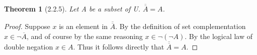 \documentclass[a4paper, 12pt]{article}
\theoremstyle{plain}
\newtheorem*{theorem*}{Theorem}
\begin{document}
	
	\begin{theorem*}[2.2.5]
		Let A be a subset of U. $\overline{\overline{A}} = A$.
	\end{theorem*}
	
	\begin{proof}
		Suppose $x$ is an element in $\overline{\overline{A}}$. By the definition of set complementation 
		$x \in \lnot \overline{A}$, and of course by the same reasoning $x \in \lnot ( \lnot A)$. By the 
		logical law of double negation $x \in A$. Thus it follows directly that 
		$\overline{\overline{A}} = A$.
	\end{proof}
\end{document}
